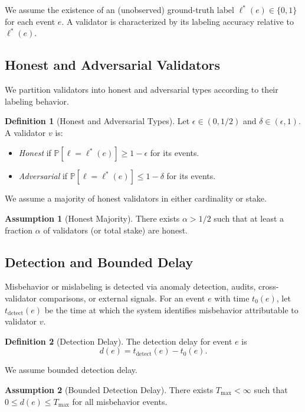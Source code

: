 \documentclass[11pt]{article}
\theoremstyle{plain}
\theoremstyle{definition}
\newtheorem{definition}{Definition}
\newtheorem{assumption}{Assumption}
\begin{document}
We assume the existence of an (unobserved) ground-truth label \(\ell^*(e) \in \{0,1\}\) for each event \(e\). A validator is characterized by its labeling accuracy relative to \(\ell^*(e)\).

\subsection{Honest and Adversarial Validators}

We partition validators into honest and adversarial types according to their labeling behavior.

\begin{definition}[Honest and Adversarial Types]
Let \(\epsilon \in (0,1/2)\) and \(\delta \in (\epsilon,1)\). A validator \(v\) is:
\begin{itemize}[leftmargin=*]
  \item \emph{Honest} if \(\mathbb{P}[\ell = \ell^*(e)] \ge 1 - \epsilon\) for its events.
  \item \emph{Adversarial} if \(\mathbb{P}[\ell = \ell^*(e)] \le 1 - \delta\) for its events.
\end{itemize}
\end{definition}

We assume a majority of honest validators in either cardinality or stake.

\begin{assumption}[Honest Majority]
There exists \(\alpha > 1/2\) such that at least a fraction \(\alpha\) of validators (or total stake) are honest.
\end{assumption}

\subsection{Detection and Bounded Delay}

Misbehavior or mislabeling is detected via anomaly detection, audits, cross-validator comparisons, or external signals. For an event \(e\) with time \(t_0(e)\), let \(t_{\mathrm{detect}}(e)\) be the time at which the system identifies misbehavior attributable to validator \(v\).

\begin{definition}[Detection Delay]
The detection delay for event \(e\) is
\[
d(e) = t_{\mathrm{detect}}(e) - t_0(e).
\]
\end{definition}

We assume bounded detection delay.

\begin{assumption}[Bounded Detection Delay]
There exists \(T_{\max} < \infty\) such that \(0 \le d(e) \le T_{\max}\) for all misbehavior events.
\end{assumption}
\end{document}

